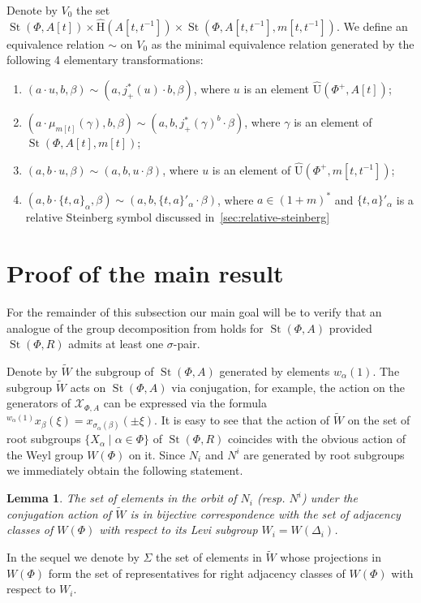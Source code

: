 \documentclass[oneside, 10pt]{amsart}
\DeclareMathOperator{\St}{St}
\newcommand{\UU}{\hat{\mathrm{U}}}      %
\newcommand{\StH}{\hat{\mathrm{H}}}     %
\newcommand{\ext}[1]{\mu_{#1}}           %
\numberwithin{equation}{section}
\newtheorem{lemma}{Lemma}
\numberwithin{lemma}{section}
\theoremstyle{definition}
\theoremstyle{remark}
\begin{document}
Denote by $V_0$ the set $\St(\Phi, A[t]) \times \StH(A[t, t^{-1}]) \times \St(\Phi, A[t, t^{-1}], m[t, t^{-1}])$. 
We define an equivalence relation $\sim$ on $V_0$ as the minimal equivalence relation generated by the following 4 elementary transformations:
\begin{enumerate}
 \item $(a \cdot u, b, \beta) \sim (a, j_+^*(u) \cdot b, \beta)$, where $u$ is an element $\UU(\Phi^+, A[t])$;
 \item $(a \cdot \ext{m[t]}(\gamma), b, \beta) \sim (a, b, j^*_+(\gamma)^b \cdot \beta)$, where $\gamma$ is an element of $\St(\Phi, A[t], m[t])$;
 \item $(a, b \cdot u, \beta) \sim (a, b, u\cdot \beta)$, where $u$ is an element of $\UU(\Phi^+, m[t, t^{-1}])$;
 \item $(a, b \cdot \{ t, a \}_\alpha, \beta) \sim (a, b, \{ t, a \}'_\alpha \cdot \beta) $, where $a \in (1+m)^*$
  and $\{t, a\}'_\alpha$ is a relative Steinberg symbol discussed in~\cref{sec:relative-steinberg}
\end{enumerate}

\section{Proof of the main result}
For the remainder of this subsection our main goal will be to verify that an analogue of the group decomposition from \cite[Lemma~3.1f]{Tu83} holds for $\St(\Phi, A)$
 provided $\St(\Phi, R)$ admits at least one $\sigma$-pair.

Denote by $\widetilde{W}$ the subgroup of $\St(\Phi, A)$ generated by elements $w_\alpha(1)$.
The subgroup $\widetilde{W}$ acts on $\St(\Phi, A)$ via conjugation, for example, 
 the action on the generators of $\mathcal{X}_{\Phi, A}$ can be expressed via the formula ${}^{w_\alpha(1)} \!x_{\beta}(\xi) = x_{\sigma_{\alpha}(\beta)} ( \pm \xi)$.
It is easy to see that the action of $\widetilde{W}$ on the set of root subgroups $\{X_\alpha \mid \alpha \in \Phi \}$ of $\St(\Phi, R)$ coincides with the obvious
 action of the Weyl group $W(\Phi)$ on it. Since $N_i$ and $N^i$ are generated by root subgroups we immediately obtain the following statement.
\begin{lemma} The set of elements in the orbit of $N_i$ (resp. $N^i$) under the conjugation action of $\widetilde{W}$ 
is in bijective correspondence with 
the set of adjacency classes of $W(\Phi)$ with respect to its Levi subgroup $W_i = W(\Delta_i)$. %
\end{lemma}
In the sequel we denote by $\Sigma$ the set of elements in $\widetilde{W}$ whose projections in $W(\Phi)$ form the set of representatives for
 right adjacency classes of $W(\Phi)$ with respect to $W_i$. %
\end{document}
